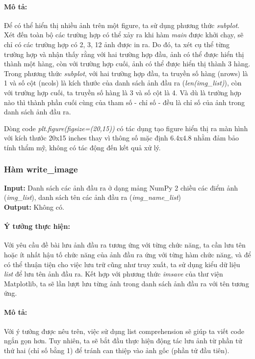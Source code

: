 \documentclass{article}
\begin{document}
\paragraph{Mô tả:} Để có thể hiển thị nhiều ảnh trên một figure, ta sử dụng phương thức \textit{subplot}. Xét đến toàn bộ các trường hợp có thể xảy ra khi hàm \textit{main} được khởi chạy, sẽ chỉ có các trường hợp có 2, 3, 12 ảnh được in ra. Do đó, ta xét cụ thể từng trường hợp và nhận thấy rằng với hai trường hợp đầu, ảnh có thể được hiển thị thành một hàng, còn với trường hợp cuối, ảnh có thể được hiển thị thành 3 hàng. Trong phương thức \textit{subplot}, với hai trường hợp đầu, ta truyền số hàng (nrows) là 1 và số cột (ncols) là kích thước của danh sách ảnh đầu ra (\textit{len(img\_list)}), còn với trường hợp cuối, ta truyền số hàng là 3 và số cột là 4. Và dù là trường hợp nào thì thành phần cuối cùng của tham số - chỉ số - đều là chỉ số của ảnh trong danh sách ảnh đầu ra. \par

Dòng code \textit{plt.figure(figsize=(20,15))} có tác dụng tạo figure hiển thị ra màn hình với kích thước 20x15 inches thay vì thông số mặc định 6.4x4.8 nhằm đảm bảo tính thẩm mỹ, không có tác động đến kết quả xử lý.

\subsubsection{Hàm write\_image}
\textbf{Input:} Danh sách các ảnh đầu ra ở dạng mảng NumPy 2 chiều các điểm ảnh (\textit{img\_list}), danh sách tên các ảnh đầu ra (\textit{img\_name\_list}) \\
\textbf{Output:} Không có.
\paragraph{Ý tưởng thực hiện:} Với yêu cầu đề bài lưu ảnh đầu ra tương ứng với từng chức năng, ta cần lưu tên hoặc ít nhất hậu tố chức năng của ảnh đầu ra ứng với từng hàm chức năng, và để có thể thuận tiện cho việc lưu trữ cũng như truy xuất, ta sử dụng kiểu dữ liệu \textit{list} để lưu tên ảnh đầu ra. Kết hợp với phương thức \textit{imsave} của thư viện Matplotlib, ta sẽ lần lượt lưu từng ảnh trong danh sách ảnh đầu ra với tên tương ứng.
\paragraph{Mô tả:} Với ý tưởng được nêu trên, việc sử dụng list comprehension sẽ giúp ta viết code ngắn gọn hơn. Tuy nhiên, ta sẽ bắt đầu thực hiện động tác lưu ảnh từ phần tử thứ hai (chỉ số bằng 1) để tránh can thiệp vào ảnh gốc (phần tử đầu tiên).
\end{document}
